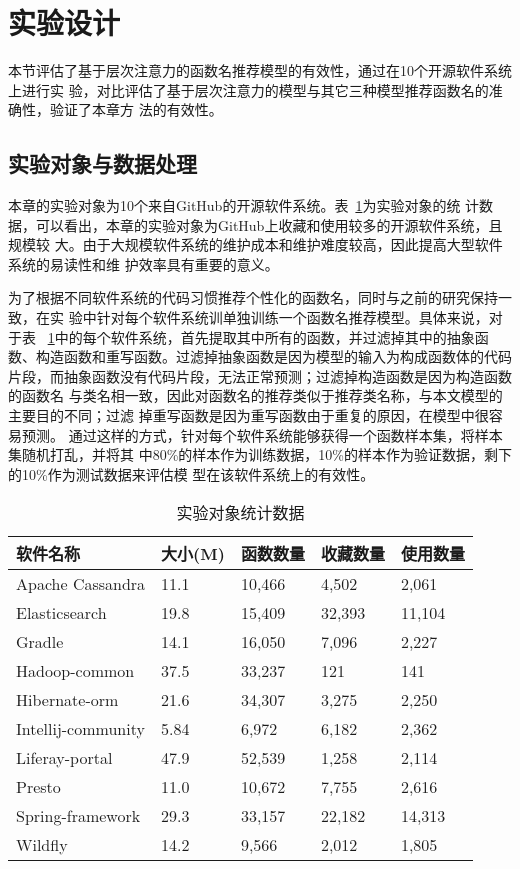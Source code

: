 \section{实验设计}
本节评估了基于层次注意力的函数名推荐模型的有效性，通过在10个开源软件系统上进行实
验，对比评估了基于层次注意力的模型与其它三种模型推荐函数名的准确性，验证了本章方
法的有效性。

\subsection{实验对象与数据处理}
本章的实验对象为10个来自GitHub的开源软件系统。表~\ref{benchmark3}为实验对象的统
计数据，可以看出，本章的实验对象为GitHub上收藏和使用较多的开源软件系统，且规模较
大。由于大规模软件系统的维护成本和维护难度较高，因此提高大型软件系统的易读性和维
护效率具有重要的意义。


为了根据不同软件系统的代码习惯推荐个性化的函数名，同时与之前的研究保持一致，在实
验中针对每个软件系统训单独训练一个函数名推荐模型。具体来说，对于表
~\ref{benchmark3}中的每个软件系统，首先提取其中所有的函数，并过滤掉其中的抽象函
数、构造函数和重写函数。过滤掉抽象函数是因为模型的输入为构成函数体的代码
片段，而抽象函数没有代码片段，无法正常预测；过滤掉构造函数是因为构造函数的函数名
与类名相一致，因此对函数名的推荐类似于推荐类名称，与本文模型的主要目的不同；过滤
掉重写函数是因为重写函数由于重复的原因，在模型中很容易预测。
通过这样的方式，针对每个软件系统能够获得一个函数样本集，将样本集随机打乱，并将其
中80\%的样本作为训练数据，10\%的样本作为验证数据，剩下的10\%作为测试数据来评估模
型在该软件系统上的有效性。

\begin{table}[!t]
\scriptsize
\renewcommand{\arraystretch}{1.4}
\caption{实验对象统计数据}
\label{benchmark3}
\centering
\begin{tabular}{l@{\quad}l@{\quad}l@{\quad}l@{\quad}l}
\toprule 
软件名称 &大小(M) &函数数量 &收藏数量 &使用数量\\ 
\hline
Apache Cassandra &11.1 &10,466 &4,502 &2,061\\ 
Elasticsearch &19.8 &15,409 &32,393 &11,104\\ 
Gradle &14.1 &16,050 &7,096 &2,227\\ 
Hadoop-common &37.5 &33,237 &121 &141\\ 
Hibernate-orm &21.6 &34,307 &3,275 &2,250\\ 
Intellij-community &5.84 &6,972 &6,182 &2,362\\ 
Liferay-portal &47.9 &52,539 &1,258 &2,114\\ 
Presto &11.0 &10,672 &7,755 &2,616\\ 
Spring-framework &29.3 &33,157 &22,182 &14,313\\ 
Wildfly &14.2 &9,566 &2,012 &1,805\\ 
\bottomrule
\end{tabular}
\end{table}

